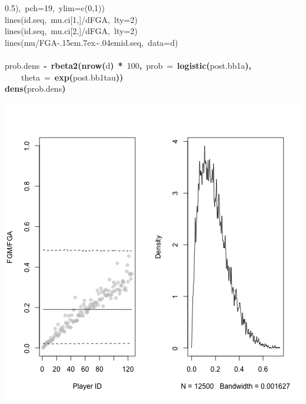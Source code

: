 \documentclass{article}
\makeatletter
\newcommand{\hlnumber}[1]{\textcolor[rgb]{0,0,0}{#1}}%
\newcommand{\hlfunctioncall}[1]{\textcolor[rgb]{.5,0,.33}{\textbf{#1}}}%
\newcommand{\hlkeyword}[1]{\textbf{#1}}%
\newcommand{\hlargument}[1]{\textcolor[rgb]{.69,.25,.02}{#1}}%
\newcommand{\hlcomment}[1]{\textcolor[rgb]{.18,.6,.34}{#1}}%
\newcommand{\hlassignement}[1]{\textbf{#1}}%
\newcommand{\hlsymbol}[1]{#1}%
\def\urltilda{\kern -.15em\lower .7ex\hbox{\~{}}\kern .04em}%
\newcommand{\hlstd}[1]{\textcolor[rgb]{0,0,0}{#1}}%
\newenvironment{kframe}{%
 \def\FrameCommand##1{\hskip\@totalleftmargin \hskip-\fboxsep
 \colorbox{shadecolor}{##1}\hskip-\fboxsep
     \hskip-\linewidth \hskip-\@totalleftmargin \hskip\columnwidth}%
 \MakeFramed {\advance\hsize-\width
   \@totalleftmargin\z@ \linewidth\hsize
   \@setminipage}}%
 {\par\unskip\endMakeFramed}
\newenvironment{knitrout}{}{} %
\makeatother
\begin{document}
\begin{knitrout}
{\begin{kframe}
\begin{flushleft}
\hlstd{}\hlcomment{\usebox{\hlnormalsizeboxhash}{\ }{\ }{\ }0.5),{\ }pch=19,{\ }ylim=c(0,1))}\hspace*{\fill}\\
\hlstd{}\hlcomment{\usebox{\hlnormalsizeboxhash}\usebox{\hlnormalsizeboxhash}{\ }lines(id.seq,{\ }mu.ci[1,]/d\usebox{\hlnormalsizeboxdollar}FGA,{\ }lty=2)}\hspace*{\fill}\\
\hlstd{}\hlcomment{\usebox{\hlnormalsizeboxhash}\usebox{\hlnormalsizeboxhash}{\ }lines(id.seq,{\ }mu.ci[2,]/d\usebox{\hlnormalsizeboxdollar}FGA,{\ }lty=2)}\hspace*{\fill}\\
\hlstd{}\hlcomment{\usebox{\hlnormalsizeboxhash}\usebox{\hlnormalsizeboxhash}{\ }lines(mu/FGA\urltilda{}id.seq,{\ }data=d)}\hspace*{\fill}\\
\hlstd{}\hspace*{\fill}\\
\hlstd{}\hlsymbol{prob.dens}{\ }\hlassignement{\usebox{\hlnormalsizeboxlessthan}-}{\ }\hlfunctioncall{rbeta2}\hlkeyword{(}\hlfunctioncall{nrow}\hlkeyword{(}\hlsymbol{d}\hlkeyword{)}{\ }\hlkeyword{*}{\ }\hlnumber{100}\hlkeyword{,}{\ }\hlargument{prob}{\ }\hlargument{=}{\ }\hlfunctioncall{logistic}\hlkeyword{(}\hlsymbol{post.bb1}\hlkeyword{\usebox{\hlnormalsizeboxdollar}}\hlsymbol{a}\hlkeyword{)}\hlkeyword{,}\hspace*{\fill}\\
\hlstd{}{\ }{\ }{\ }{\ }\hlargument{theta}{\ }\hlargument{=}{\ }\hlfunctioncall{exp}\hlkeyword{(}\hlsymbol{post.bb1}\hlkeyword{\usebox{\hlnormalsizeboxdollar}}\hlsymbol{tau}\hlkeyword{)}\hlkeyword{)}\hspace*{\fill}\\
\hlstd{}\hlfunctioncall{dens}\hlkeyword{(}\hlsymbol{prob.dens}\hlkeyword{)}\mbox{}
\normalfont
\end{flushleft}
\includegraphics{post-bs2} \begin{flushleft}

\end{flushleft}
\end{kframe}}
\end{knitrout}
\end{document}
